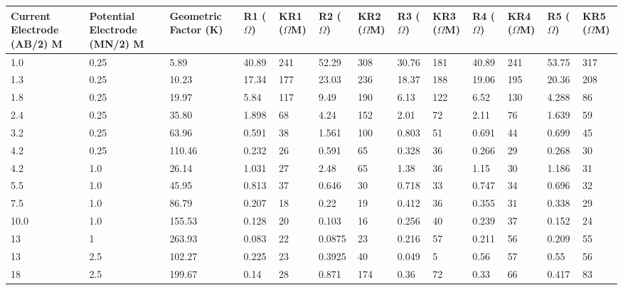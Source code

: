 \documentclass[12pt,a4paper]{report}
\begin{document}
\begin{table}[h!]
    \centering
    \begin{adjustbox}{max width=\textwidth}
    \renewcommand{\arraystretch}{1.5}
    \begin{tabular}{|p{2.5cm}|p{2.5cm}|p{2.5cm}|p{1.5cm}|p{1.8cm}|p{1.5cm}|p{1.8cm}|p{1.5cm}|p{1.8cm}|p{1.5cm}|p{1.8cm}|p{1.5cm}|p{1.8cm}|}
    \hline
    \textbf{Current Electrode (AB/2) M} & 
    \textbf{Potential Electrode (MN/2) M} & 
    \textbf{Geometric Factor (K)} & 
    \textbf{R1 ($\Omega$)} & 
    \textbf{KR1 ($\Omega$M)} & 
    \textbf{R2 ($\Omega$)} & 
    \textbf{KR2 ($\Omega$M)} & 
    \textbf{R3 ($\Omega$)} & 
    \textbf{KR3 ($\Omega$M)} & 
    \textbf{R4 ($\Omega$)} & 
    \textbf{KR4 ($\Omega$M)} & 
    \textbf{R5 ($\Omega$)} & 
    \textbf{KR5 ($\Omega$M)} \\ 
    \hline
    1.0 & 0.25 & 5.89 & 40.89 & 241 & 52.29 & 308 & 30.76 & 181 & 40.89 & 241 & 53.75 & 317 \\ \hline
    1.3 & 0.25 & 10.23 & 17.34 & 177 & 23.03 & 236 & 18.37 & 188 & 19.06 & 195 & 20.36 & 208 \\ \hline
    1.8 & 0.25 & 19.97 & 5.84 & 117 & 9.49 & 190 & 6.13 & 122 & 6.52 & 130 & 4.288 & 86 \\ \hline
    2.4 & 0.25 & 35.80 & 1.898 & 68 & 4.24 & 152 & 2.01 & 72 & 2.11 & 76 & 1.639 & 59 \\ \hline
    3.2 & 0.25 & 63.96 & 0.591 & 38 & 1.561 & 100 & 0.803 & 51 & 0.691 & 44 & 0.699 & 45 \\ \hline
    4.2 & 0.25 & 110.46 & 0.232 & 26 & 0.591 & 65 & 0.328 & 36 & 0.266 & 29 & 0.268 & 30 \\ \hline
    4.2 & 1.0 & 26.14 & 1.031 & 27 & 2.48 & 65 & 1.38 & 36 & 1.15 & 30 & 1.186 & 31 \\ \hline
    5.5 & 1.0 & 45.95 & 0.813 & 37 & 0.646 & 30 & 0.718 & 33 & 0.747 & 34 & 0.696 & 32 \\ \hline
    7.5 & 1.0 & 86.79 & 0.207 & 18 & 0.22 & 19 & 0.412 & 36 & 0.355 & 31 & 0.338 & 29 \\ \hline
    10.0 & 1.0 & 155.53 & 0.128 & 20 & 0.103 & 16 & 0.256 & 40 & 0.239 & 37 & 0.152 & 24 \\ \hline
    13 & 1 & 263.93 & 0.083 & 22 & 0.0875 & 23 & 0.216 & 57 & 0.211 & 56 & 0.209 & 55 \\ \hline
    13 & 2.5 & 102.27 & 0.225 & 23 & 0.3925 & 40 & 0.049 & 5 & 0.56 & 57 & 0.55 & 56 \\ \hline
    18 & 2.5 & 199.67 & 0.14 & 28 & 0.871 & 174 & 0.36 & 72 & 0.33 & 66 & 0.417 & 83 \\ \hline

\end{tabular}
\end{adjustbox}
\end{table}
\end{document}
